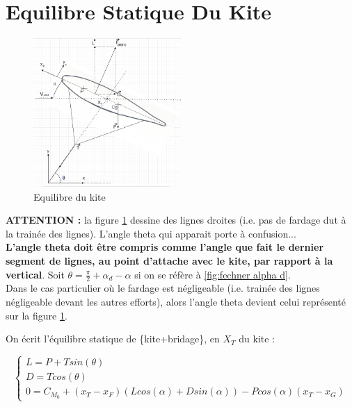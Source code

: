 \section{\textbf{Equilibre Statique Du Kite}} 
\label{sec:Ch1.2}

\begin{figure}[H]
    \centering
    \includegraphics[width=0.5\textwidth]{Pics/01 - xt et towpoint/Equilibre Kite.png}  
    \caption{Equilibre du kite}
    \label{fig:Equilibre du kite}
\end{figure}

\textbf{ATTENTION :} la figure \ref{fig:Equilibre du kite} dessine des lignes droites (i.e. pas de fardage dut à la trainée des lignes). L'angle theta qui apparait porte à confusion...\\

\textbf{L'angle theta doit être compris comme l'angle que fait le dernier segment de lignes, au point d'attache avec le kite, par rapport à la vertical}. Soit $\theta = \frac{\pi}{2} + \alpha_d - \alpha$ si on se réfère à \ref{fig:fechner alpha d}.\\

Dans le cas particulier où le fardage est négligeable (i.e. trainée des lignes négligeable devant les autres efforts), alors l'angle theta devient celui représenté sur la figure \ref{fig:Equilibre du kite}.

On écrit l'équilibre statique de \{kite+bridage\}, en $X_T$ du kite : 

\begin{equation}
    \begin{cases}
        L = P + T sin(\theta) \\
        D = T cos(\theta) \\
        0 = C_{M_0} + (x_T - x_F) (L cos(\alpha) + D sin(\alpha)) - P cos(\alpha) (x_T - x_G)
    \end{cases}
\end{equation}

